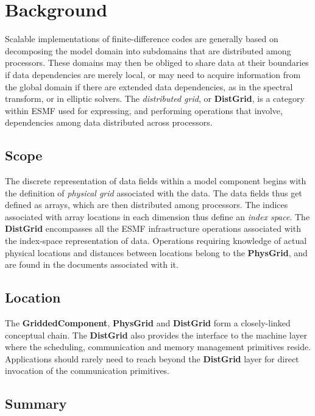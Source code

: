 
\section{Background}

Scalable implementations of finite-difference codes are generally
based on decomposing the model domain into subdomains that are
distributed among processors. These domains may then be obliged to
share data at their boundaries if data dependencies are merely
local, or may need to acquire information from the global domain if
there are extended data dependencies, as in the spectral transform, or
in elliptic solvers. The \emph{distributed grid}, or
\textbf{DistGrid}, is a category within ESMF used for expressing, and
performing operations that involve, dependencies among data
distributed across processors.

\subsection{Scope}

The discrete representation of data fields within a model component
begins with the definition of \emph{physical grid} associated with the
data. The data fields thus get defined as arrays, which are then
distributed among processors. The indices associated with array
locations in each dimension thus define an \emph{index space}. The
\textbf{DistGrid} encompasses all the ESMF infrastructure operations
associated with the index-space representation of data. Operations
requiring knowledge of actual physical locations and distances between
locations belong to the \textbf{PhysGrid}, and are found in the
documents associated with it.

\subsection{Location}

The \textbf{GriddedComponent}, \textbf{PhysGrid} and \textbf{DistGrid}
form a closely-linked conceptual chain. The \textbf{DistGrid} also
provides the interface to the machine layer where the scheduling,
communication and memory management primitives reside. Applications
should rarely need to reach beyond the \textbf{DistGrid} layer for
direct invocation of the communication primitives.


\subsection{Summary}

